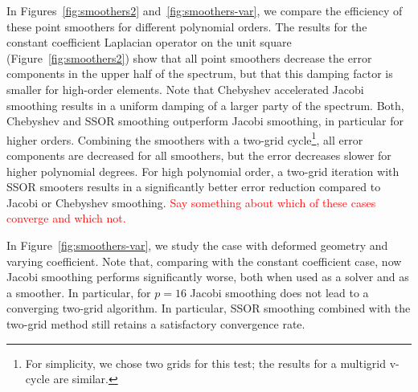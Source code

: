 \documentclass[smallcondensed,final]{svjour3}     %
\newcommand{\todo}[1]{\textcolor{red}{ #1}}
\begin{document}
In Figures~\ref{fig:smoothers2} and~\ref{fig:smoothers-var}, we
compare the efficiency of these point smoothers for different
polynomial orders. The results for the constant coefficient Laplacian
operator on the unit square (Figure~\ref{fig:smoothers2}) show that
all point smoothers decrease the error components in the upper half of
the spectrum, but that this damping factor is smaller for high-order
elements. Note that Chebyshev accelerated Jacobi smoothing results in
a uniform damping of a larger party of the spectrum. Both, Chebyshev
and SSOR smoothing outperform Jacobi smoothing, in particular for
higher orders. Combining the smoothers with a two-grid
cycle\footnote{For simplicity, we chose two grids for this test; the
  results for a multigrid v-cycle are similar.}, all error components
are decreased for all smoothers, but the error decreases slower for
higher polynomial degrees. For high polynomial order, a two-grid
iteration with SSOR smooters results in a significantly better error
reduction compared to Jacobi or Chebyshev smoothing. \todo{Say
  something about which of these cases converge and which not.}

In Figure~\ref{fig:smoothers-var}, we study the case with deformed
geometry and varying coefficient. Note that, comparing with the
constant coefficient case, now Jacobi smoothing performs significantly
worse, both when used as a solver and as a smoother. In particular,
for $p=16$ Jacobi smoothing does not lead to a converging two-grid
algorithm. In particular, SSOR smoothing combined with the two-grid
method still retains a satisfactory convergence rate.
\end{document}

